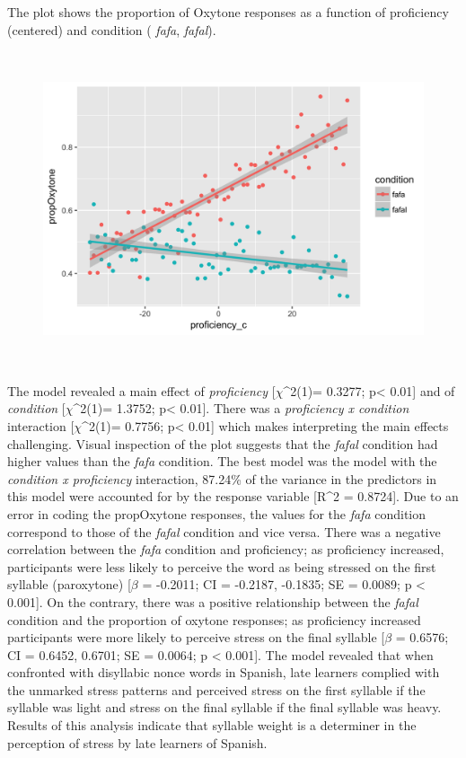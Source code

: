 \documentclass[man]{apa6}
\theoremstyle{definition}
\theoremstyle{definition}
\theoremstyle{definition}
\theoremstyle{remark}
\begin{document}
The plot shows the proportion of Oxytone responses as a function of
proficiency (centered) and condition ( \emph{fafa}, \emph{fafal}).

\begin{figure}

{\centering \includegraphics[width=450px,height=350px]{../figs/span_stress6x4} 

}

\caption{ }\label{fig:unnamed-chunk-1}
\end{figure}

The model revealed a main effect of \emph{proficiency}
{[}\(\chi\)\^{}2(1)= 0.3277; p\textless{} 0.01{]} and of
\emph{condition} {[}\(\chi\)\^{}2(1)= 1.3752; p\textless{} 0.01{]}.
There was a \emph{proficiency x condition} interaction
{[}\(\chi\)\^{}2(1)= 0.7756; p\textless{} 0.01{]} which makes
interpreting the main effects challenging. Visual inspection of the plot
suggests that the \emph{fafal} condition had higher values than the
\emph{fafa} condition. The best model was the model with the
\emph{condition x proficiency} interaction, 87.24\% of the variance in
the predictors in this model were accounted for by the response variable
{[}R\^{}2 = 0.8724{]}. Due to an error in coding the propOxytone
responses, the values for the \emph{fafa} condition correspond to those
of the \emph{fafal} condition and vice versa. There was a negative
correlation between the \emph{fafa} condition and proficiency; as
proficiency increased, participants were less likely to perceive the
word as being stressed on the first syllable (paroxytone) {[}\(\beta\) =
-0.2011; CI = -0.2187, -0.1835; SE = 0.0089; p \textless{} 0.001{]}. On
the contrary, there was a positive relationship between the \emph{fafal}
condition and the proportion of oxytone responses; as proficiency
increased participants were more likely to perceive stress on the final
syllable {[}\(\beta\) = 0.6576; CI = 0.6452, 0.6701; SE = 0.0064; p
\textless{} 0.001{]}. The model revealed that when confronted with
disyllabic nonce words in Spanish, late learners complied with the
unmarked stress patterns and perceived stress on the first syllable if
the syllable was light and stress on the final syllable if the final
syllable was heavy. Results of this analysis indicate that syllable
weight is a determiner in the perception of stress by late learners of
Spanish.
\end{document}
